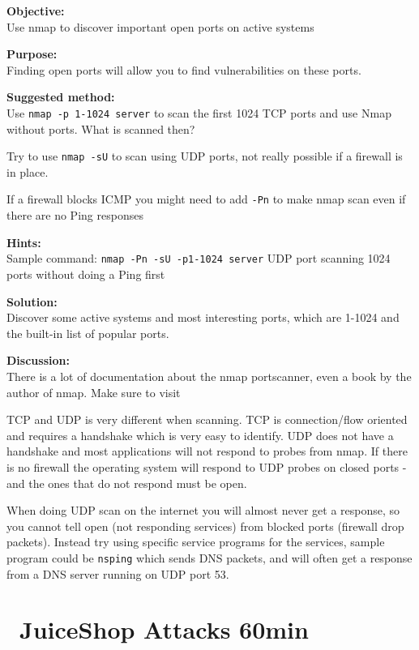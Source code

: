 \documentclass[a4paper,11pt,notitlepage]{report}
\begin{document}
{\bf Objective:} \\
Use nmap to discover important open ports on active systems

{\bf Purpose:}\\
Finding open ports will allow you to find vulnerabilities on these ports.

{\bf Suggested method:}\\
Use \verb+nmap -p 1-1024 server+ to scan the first 1024 TCP
ports and use Nmap without ports. What is scanned then?

Try to use \verb+nmap -sU+ to scan using UDP ports, not really possible if a firewall is in place.

If a firewall blocks ICMP you might need to add \verb+-Pn+ to make nmap scan even if there are no Ping responses

{\bf Hints:} \\
Sample command: \verb+nmap -Pn -sU -p1-1024 server+ UDP port scanning
1024 ports without doing a Ping first

{\bf Solution:}\\
Discover some active systems and most interesting ports, which are 1-1024 and the built-in list of popular ports.

{\bf Discussion:}\\
There is a lot of documentation about the nmap portscanner, even a book by the author
of nmap. Make sure to visit 

TCP and UDP is very different when scanning. TCP is connection/flow oriented and requires a handshake which is very easy to identify. UDP does not have a handshake and most applications will not respond to probes from nmap. If there is no firewall the operating system will respond to UDP probes on closed ports - and the ones that do not respond must be open.

When doing UDP scan on the internet you will almost never get a response, so you cannot tell open (not responding services) from blocked ports (firewall drop packets). Instead try using specific service programs for the services, sample program could be \verb+nsping+ which sends DNS packets, and will often get a response from a DNS server running on UDP port 53.


\chapter{\faExclamationTriangle\ JuiceShop Attacks 60min}
\label{ex:juiceshop-attack}
\end{document}
